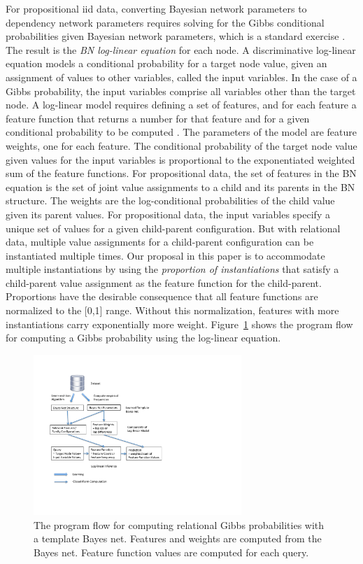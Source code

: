 \documentclass[twoside,11pt]{article}
\begin{document}
For propositional iid data, converting Bayesian network parameters to dependency network parameters requires solving for the Gibbs conditional probabilities given Bayesian network parameters, which is a standard exercise \cite[Ch.14.5.2]{Russell2010}. The result is the {\em BN log-linear equation} for each node. A discriminative log-linear equation models a conditional probability for a target node value, given an assignment of values to other variables, called the input variables. In the case of a Gibbs probability, the input variables comprise all variables other than the target node. A log-linear model requires defining a set of features, and for each feature a feature function that returns a number for that feature and for a given conditional probability to be computed \cite{Sutton2007}. The parameters of the model are feature weights, one for each feature. The conditional probability of the target node value given values for the input variables is proportional to the exponentiated weighted sum of the feature functions. For propositional data, the  set of features in the BN equation is the set of joint value assignments to a child and its parents in the BN structure. The weights are the log-conditional probabilities of the child value given its parent values. For propositional data, the input variables specify a unique set of values for a given child-parent configuration. But with relational data, multiple value assignments for a child-parent configuration can be instantiated multiple times. Our proposal in this paper is to accommodate multiple instantiations by using the {\em proportion of instantiations} that satisfy a child-parent value assignment as the feature function for the child-parent. Proportions have the desirable consequence that all feature functions are normalized to the [0,1] range. Without this normalization, features with more instantiations carry exponentially more weight.  Figure~\ref{fig:bn-flow} shows the program flow for computing a Gibbs probability using the log-linear equation.

\begin{figure}[htbp]

\begin{center}
\includegraphics[width=0.7\textwidth]{bn-regress}
\caption{The program flow for computing relational Gibbs probabilities with a template Bayes net. Features and weights are computed from the Bayes net. Feature function values are computed for each query.}
\label{fig:bn-flow}
\end{center}

\end{figure}
\end{document}
